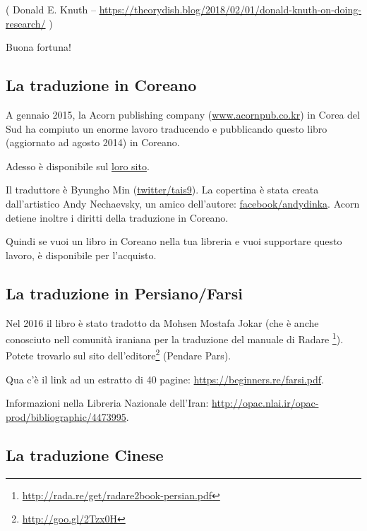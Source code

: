 
( Donald E. Knuth -- \url{https://theorydish.blog/2018/02/01/donald-knuth-on-doing-research/} )

Buona fortuna!

\subsection*{La traduzione in Coreano}

A gennaio 2015, la Acorn publishing company (\href{http://www.acornpub.co.kr}{www.acornpub.co.kr}) in Corea del Sud ha compiuto un enorme lavoro traducendo e pubblicando
questo libro (aggiornato ad agosto 2014) in Coreano.

Adesso è disponibile sul \href{http://go.yurichev.com/17343}{loro sito}.

Il traduttore è Byungho Min (\href{http://go.yurichev.com/17344}{twitter/tais9}).
La copertina è stata creata dall'artistico Andy Nechaevsky, un amico dell'autore:
\href{http://go.yurichev.com/17023}{facebook/andydinka}.
Acorn detiene inoltre i diritti della traduzione in Coreano.

Quindi se vuoi un  libro in Coreano nella tua libreria e
vuoi supportare questo lavoro, è disponibile per l'acquisto.

\subsection*{La traduzione in Persiano/Farsi}

Nel 2016 il libro è stato tradotto da Mohsen Mostafa Jokar (che è anche conosciuto nell comunità iraniana per la traduzione del manuale di Radare \footnote{\url{http://rada.re/get/radare2book-persian.pdf}}).
Potete trovarlo sul sito dell'editore\footnote{\url{http://goo.gl/2Tzx0H}} (Pendare Pars).

Qua c'è il link ad un estratto di 40 pagine: \url{https://beginners.re/farsi.pdf}.

Informazioni nella Libreria Nazionale dell'Iran: \url{http://opac.nlai.ir/opac-prod/bibliographic/4473995}.

\subsection*{La traduzione Cinese}

